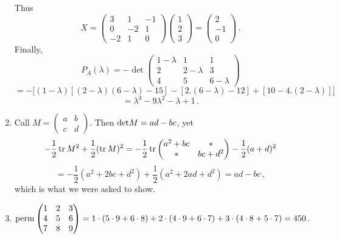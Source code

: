 \begin{enumerate}
Thus
\[
X=\begin{pmatrix}3&1& -1\\ 0&-2& 1 \\-2&1 & 0 \end{pmatrix}
\begin{pmatrix}1\\2\\3
\end{pmatrix}=
\begin{pmatrix}2\\-1\\0
\end{pmatrix}\, .
\]
Finally, 
\[
P_A(\lambda)=-\det \begin{pmatrix}1-\lambda&1&1\\2&2-\lambda&3\\4&5&6-\lambda\end{pmatrix}\]
\[
=-\Big[(1-\lambda)[(2-\lambda)(6-\lambda)-15]-[2.(6-\lambda)-12]+[10-4.(2-\lambda)]\Big]
\]
\[
=\lambda^3-9\lambda^2-\lambda+1\, .
\]
\item
Call $M=\begin{pmatrix}a&b\\c&d\end{pmatrix}$. Then ${\rm det} M= ad-bc$, yet
\[
-\frac 12 \operatorname{tr} M^2 + \frac12 (\operatorname{tr} M)^2 = -\frac 12 \operatorname{tr} \begin{pmatrix}a^2 + bc & * \\ * & bc + d^2\end{pmatrix} -\frac12 (a+d)^2\] \[ 
=-\frac 12 (a^2 + 2bc + d^2) + \frac 12 (a^2 + 2ad + d^2) = ad - bc\, ,
\]
which is what we were asked to show.

\item 

\[
{\rm perm} \begin{pmatrix}1 & 2 & 3 \\ 4 & 5 & 6 \\ 7 & 8 & 9\end{pmatrix}
=1\cdot(5\cdot9+6\cdot8)+2\cdot(4\cdot9+6\cdot7)+3\cdot(4\cdot8+5\cdot7)=450\, .
\]


\end{enumerate}
